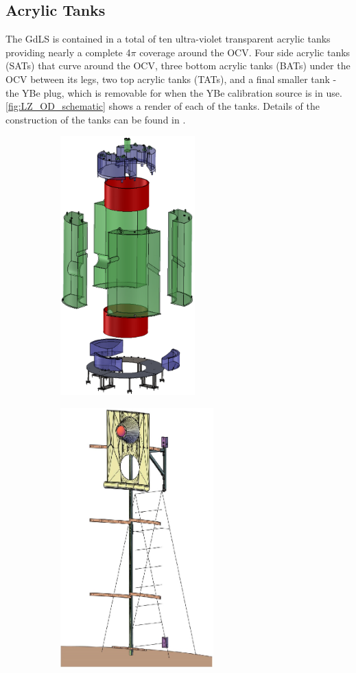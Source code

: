 \subsection{Acrylic Tanks}
\par
The GdLS is contained in a total of ten ultra-violet transparent acrylic tanks providing nearly a complete 4$\pi$ coverage around the OCV.
Four side acrylic tanks (SATs) that curve around the OCV, three bottom acrylic tanks (BATs) under the OCV between its legs, two top acrylic tanks (TATs), and a final smaller tank - the YBe plug, which is removable for when the YBe calibration source is in use.
\autoref{fig:LZ_OD_schematic} shows a render of each of the tanks.
Details of the construction of the tanks can be found in \cite{scotthaselschwardt_thesis_ref}.

\begin{figure}[]
  \begin{subfigure}{.5\textwidth}
  \centering
  \includegraphics[height=10cm]{Figures/LZ/OD_Tanks_CAD.png}
  \end{subfigure}
  \begin{subfigure}{.5\textwidth}
  \centering
  \includegraphics[height=10cm]{Figures/LZ/pmt_in_ladder.png}

\end{subfigure}
\end{figure}
